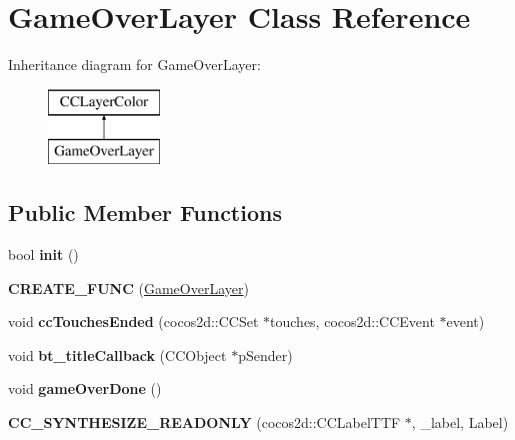 \hypertarget{class_game_over_layer}{\section{Game\-Over\-Layer Class Reference}
\label{class_game_over_layer}
}
Inheritance diagram for Game\-Over\-Layer\-:\begin{figure}[H]
\begin{center}
\leavevmode
\includegraphics[height=2.000000cm]{class_game_over_layer}
\end{center}
\end{figure}
\subsection*{Public Member Functions}
\begin{DoxyCompactItemize}
\item 
\hypertarget{class_game_over_layer_a1bca543a92d6eac7133125adf935ffc5}{bool {\bfseries init} ()}\label{class_game_over_layer_a1bca543a92d6eac7133125adf935ffc5}

\item 
\hypertarget{class_game_over_layer_aa54c977aa9f0e23f4bdd2af9a55446da}{{\bfseries C\-R\-E\-A\-T\-E\-\_\-\-F\-U\-N\-C} (\hyperlink{class_game_over_layer}{Game\-Over\-Layer})}\label{class_game_over_layer_aa54c977aa9f0e23f4bdd2af9a55446da}

\item 
\hypertarget{class_game_over_layer_ac7448f1b5f3473b64f366756ce1bc79b}{void {\bfseries cc\-Touches\-Ended} (cocos2d\-::\-C\-C\-Set $\ast$touches, cocos2d\-::\-C\-C\-Event $\ast$event)}\label{class_game_over_layer_ac7448f1b5f3473b64f366756ce1bc79b}

\item 
\hypertarget{class_game_over_layer_a7e82bc810e0fe2a471591f81e2cda6a3}{void {\bfseries bt\-\_\-title\-Callback} (C\-C\-Object $\ast$p\-Sender)}\label{class_game_over_layer_a7e82bc810e0fe2a471591f81e2cda6a3}

\item 
\hypertarget{class_game_over_layer_abbcf23a9c4b9756aa2b30f8e8e1868f0}{void {\bfseries game\-Over\-Done} ()}\label{class_game_over_layer_abbcf23a9c4b9756aa2b30f8e8e1868f0}

\item 
\hypertarget{class_game_over_layer_aa09c3bac08e80e25bd9e298d19dca588}{{\bfseries C\-C\-\_\-\-S\-Y\-N\-T\-H\-E\-S\-I\-Z\-E\-\_\-\-R\-E\-A\-D\-O\-N\-L\-Y} (cocos2d\-::\-C\-C\-Label\-T\-T\-F $\ast$, \-\_\-label, Label)}\label{class_game_over_layer_aa09c3bac08e80e25bd9e298d19dca588}

\end{DoxyCompactItemize}
